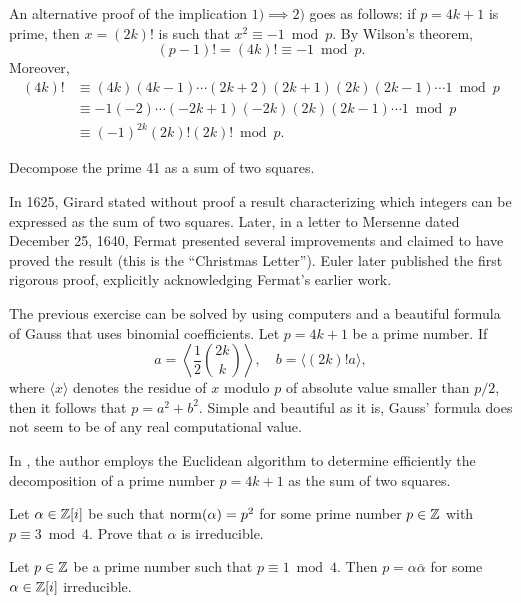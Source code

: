 \begin{optional}
An alternative proof of the implication 
$1)\implies 2)$ goes as follows: if $p=4k+1$ is prime, then 
$x=(2k)!$ is such that $x^2\equiv -1\bmod p$. 
By 
Wilson's theorem, 
\[
(p-1)! = (4k)!\equiv -1\bmod p.
\]
Moreover,  
\begin{align*}
(4k)!&\equiv(4k)(4k-1)\cdots(2k+2)(2k+1)(2k)(2k-1)\cdots1\bmod p\\
&\equiv-1(-2)\cdots(-2k+1)(-2k)(2k)(2k-1)\cdots1\bmod p\\
&\equiv(-1)^{2k}(2k)!(2k)!\bmod p.
\end{align*}
\end{optional}

\begin{exercise}
    Decompose the prime 41 as a sum of two squares. 
\end{exercise}

In 1625, Girard stated without proof a result characterizing which integers can
be expressed as the sum of two squares. Later, in a letter to Mersenne dated
December 25, 1640, Fermat presented several improvements and claimed to have proved
the result (this is the ``Christmas Letter''). Euler later published the first
rigorous proof, explicitly acknowledging Fermat's earlier work.

\begin{optional}
The previous exercise can be solved by using computers and a beautiful formula
of Gauss that uses binomial coefficients. Let $p=4k+1$ be a prime number.  If 
\[
a=\left\langle \frac12\binom{2k}{k}\right\rangle, 
\quad
b=\langle (2k)!a\rangle,
\]
where $\langle x\rangle$ denotes the 
residue of $x$ modulo $p$ of absolute value smaller than $p/2$, 
then it follows that $p=a^2+b^2$. Simple and beautiful as it is, Gauss' formula does not seem to be of any real computational value. 
\end{optional}

In \cite{MR1041889}, the author employs the Euclidean algorithm to determine efficiently 
the decomposition of a prime number $p=4k+1$ as the sum of two squares.

\begin{exercise}
\label{xca:p=3(4)}
    Let $\alpha\in\mathbb{Z}[i]$ be such that $\operatorname{norm}(\alpha)=p^2$ 
    for some prime number $p\in\mathbb{Z}$ with $p\equiv3\bmod 4$. 
    Prove that $\alpha$ is irreducible. 
\end{exercise}

\begin{exercise}
    \label{xca:p=1(4)}
    Let $p\in\mathbb{Z}$ be a prime number such that $p\equiv1\bmod 4$.
    Then $p=\alpha\overline{\alpha}$
    for some $\alpha\in\mathbb{Z}[i]$ irreducible. 
\end{exercise}

